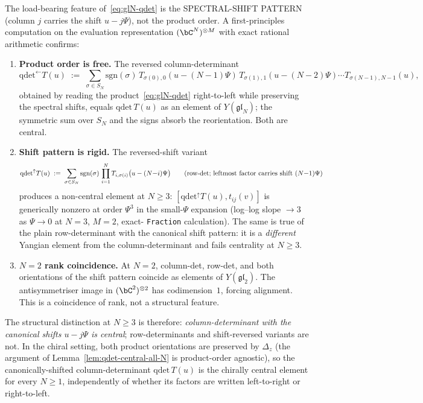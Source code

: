 \begin{remark}
\label{rem:qdet-decreasing-ordering}
The load-bearing feature of~\eqref{eq:glN-qdet} is the
SPECTRAL-SHIFT PATTERN (column $j$ carries the shift
$u - j\Psi$), not the product order. A first-principles
computation on the evaluation representation
$(\bC^N)^{\otimes M}$ with exact rational arithmetic confirms:

\begin{enumerate}[label=\textup{(\alph*)}]
\item \textbf{Product order is free.} The reversed
 column-determinant
 \[
 \mathrm{qdet}^{\leftarrow} T(u)
 \;:=\;
 \sum_{\sigma \in S_N}\mathrm{sgn}(\sigma)\,
 T_{\sigma(0),0}(u-(N{-}1)\Psi)\,
 T_{\sigma(1),1}(u-(N{-}2)\Psi)\cdots
 T_{\sigma(N-1),N-1}(u),
 \]
 obtained by reading the product~\eqref{eq:glN-qdet} right-to-left
 while preserving the spectral shifts, equals
 $\mathrm{qdet}\, T(u)$ as an element of $Y(\mathfrak{gl}_N)$;
 the symmetric sum over $S_N$ and the signs absorb the
 reorientation. Both are central.
\item \textbf{Shift pattern is rigid.} The reversed-shift variant
 \[
 \mathrm{qdet}^{\uparrow} T(u)
 \;:=\;
 \sum_{\sigma \in S_N}\mathrm{sgn}(\sigma)\,
 \prod_{i=1}^{N}
 T_{i,\sigma(i)}\bigl(u - (N{-}i)\Psi\bigr)
 \qquad\textup{(row-det; leftmost factor
 carries shift $(N{-}1)\Psi$)}
 \]
 produces a non-central element at $N \geq 3$:
 $[\mathrm{qdet}^\uparrow T(u), t_{ij}(v)]$ is generically nonzero
 at order $\Psi^3$ in the small-$\Psi$ expansion (log--log
 slope $\to 3$ as $\Psi \to 0$ at $N = 3$, $M = 2$, exact-
\texttt{Fraction} calculation). The same is true of the plain
 row-determinant with the canonical shift pattern: it is a
 \emph{different} Yangian element from the column-determinant
 and fails centrality at $N \geq 3$.
\item \textbf{$N = 2$ rank coincidence.} At $N = 2$, column-det,
 row-det, and both orientations of the shift pattern
 coincide as elements of $Y(\mathfrak{gl}_2)$. The
 antisymmetriser image in $(\bC^2)^{\otimes 2}$ has
 codimension~$1$, forcing alignment. This is a coincidence of
 rank, not a structural feature.
\end{enumerate}

The structural distinction at $N \geq 3$ is therefore:
\emph{column-determinant with the canonical shifts $u - j\Psi$ is
central}; row-determinants and shift-reversed variants are not.
In the chiral setting, both product orientations are preserved by
$\Delta_z$ (the argument of
Lemma~\textup{\ref{lem:qdet-central-all-N}} is product-order
agnostic), so the canonically-shifted column-determinant
$\mathrm{qdet}\, T(u)$ is the chirally central element for every
$N \geq 1$, independently of whether its factors are written
left-to-right or right-to-left.
\end{remark}

